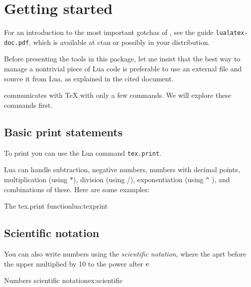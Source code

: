 \section{Getting started}

For an introduction to the most important gotchas of \cmd{\directlua}, see the guide \texttt{lualatex-doc.pdf}, which is available at ctan or possibly in your distribution.

Before presenting the tools in this package, let me insist that the best way to manage a nontrivial piece of Lua code is preferable to use an external file and source it from Lua, as explained in the cited document.

\LuaTeX communicates with TeX with only a few commands. We will explore these commands first.

\subsection{Basic print statements}

\begin{teXXX}
\end{teXXX}

To print you can use the Lua command \lstinline{tex.print}.


Lua can handle subtraction, negative numbers, numbers with decimal points, multiplication (using *),
division (using /), exponentiation (using \texttt{\^} ), and combinations of these. Here are some examples:

\begin{texexample}{The tex.print function}{lua:texprint}


\end{texexample}

\subsection{Scientific notation}

You can also write numbers using the \textit{scientific notation}, where the aprt before the upper multiplied by 10 to the power after $\textup{e}$

\begin{texexample}{Numbers scientific notation}{ex:scientific}

\end{texexample}


